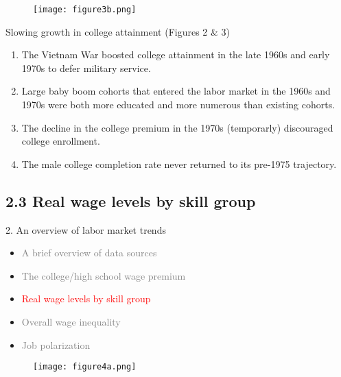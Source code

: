 \documentclass[notes=show]{beamer}
\begin{document}
\newpage
\begin{center}
\begin{figure}
\texttt{[image: figure3b.png]}
\end{figure} 
\end{center}
\newpage

\begin{frame}{Slowing growth in college attainment (Figures 2 \& 3)}
\begin{enumerate}
\item The Vietnam War boosted college attainment in the late 1960s and early 1970s to defer military service. \medskip
\item Large baby boom cohorts that entered the labor market in the 1960s and 1970s were both more educated and more numerous than existing cohorts. \medskip
\item The decline in the college premium in the 1970s (temporarly) discouraged college enrollment. \medskip
\item The male college completion rate never returned to its pre-1975 trajectory.
\end{enumerate}
\end{frame}

\subsection{2.3 Real wage levels by skill group}

\begin{frame}{2. An overview of labor market trends}
\begin{itemize}
\item[\textcolor{gray}{2.1}] \textcolor{gray}{A brief overview of data sources} \medskip
\item[\textcolor{gray}{2.2}] \textcolor{gray}{The college/high school wage premium} \medskip
\item[\textcolor{red}{2.3}] \textcolor{red}{Real wage levels by skill group} \medskip
\item[\textcolor{gray}{2.4}] \textcolor{gray}{Overall wage inequality} \medskip
\item [\textcolor{gray}{2.5}] \textcolor{gray}{Job polarization}
\end{itemize}
\end{frame}

\newpage
\begin{center}
\begin{figure}
\texttt{[image: figure4a.png]}
\end{figure} 
\end{center}
\newpage
\end{document}
